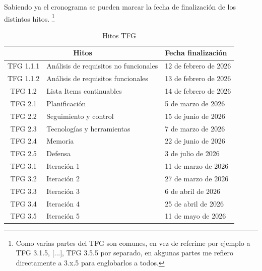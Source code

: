 Sabiendo ya el cronograma se pueden marcar la fecha de finalización de los distintos hitos. \footnote{Como varias partes del TFG son comunes, en vez de referime por ejemplo a TFG 3.1.5, [...], TFG 3.5.5 por separado, en akgunas partes me refiero directamente a 3.x.5 para englobarlos a todos. }
\begin{longtable}{|c|l|l|}
    \caption{Hitos TFG} \\
        \hline
        \multicolumn{2}{|c|}{\textbf{Hitos} } & \textbf{Fecha finalización}                                          \\
        \hline
        TFG 1.1.1                             & Análisis de requisitos no funcionales        & 12 de febrero de 2026 \\
        \hline
        TFG 1.1.2                             & Análisis de requisitos funcionales           & 13 de febrero de 2026 \\
        \hline
        TFG 1.2                               & Lista Items continuables                     & 14 de febrero de 2026 \\
        \hline
        TFG 2.1                               & Planificación                                & 5 de marzo de 2026    \\
        \hline
        TFG 2.2                               & Seguimiento y control                        & 15 de junio de 2026   \\
        \hline
        TFG 2.3                               & Tecnologías y herramientas                   & 7 de marzo de 2026    \\
        \hline
        TFG 2.4                               & Memoria                                      & 22 de junio de 2026   \\
        \hline
        TFG 2.5                               & Defensa                                      & 3 de julio de 2026    \\
        \hline
        TFG 3.1                               & Iteración 1       & 11 de marzo de 2026   \\                    
        \hline
        TFG 3.2                             &Iteración 2       & 27 de marzo de 2026   \\
        \hline
        TFG 3.3                            & Iteración 3       & 6 de abril de 2026    \\
        \hline
        TFG 3.4                            & Iteración 4       & 25 de abril de 2026   \\
        \hline
        TFG 3.5                            & Iteración 5      & 11 de mayo de 2026    \\
        \hline 
    
\end{longtable}
\label{tab:placeholder}



